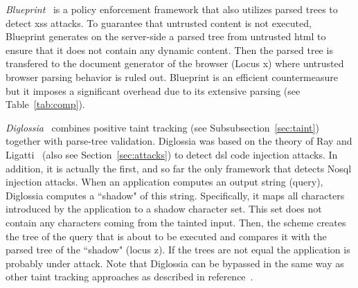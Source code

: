 \documentclass[conference]{IEEEtran}
\begin{document}
{\it Blueprint}~\cite{LV09} is a policy enforcement framework that
also utilizes parsed trees to detect {\sc xss} attacks. To guarantee
that untrusted content is not executed, Blueprint generates on the
server-side a parsed tree from untrusted {\sc html} to ensure that it
does not contain any dynamic content. Then the parsed tree is
transfered to the document generator of the browser (Locus {\sc x})
where untrusted browser parsing behavior is ruled out. Blueprint is an
efficient countermeasure but it imposes a significant overhead due to
its extensive parsing (see Table~\ref{tab:comp}).

{\it Diglossia}~\cite{SMS13} combines positive taint tracking (see
Subsubsection~\ref{sec:taint}) together with parse-tree validation.
Diglossia was based on the theory of Ray and Ligatti~\cite{RL12b}
(also see Section~\ref{sec:attacks}) to detect {\sc dsl} code
injection attacks. In addition, it is actually the first, and so far
the only framework that detects No{\sc sql} injection attacks. When an
application computes an output string (query), Diglossia computes a
``shadow" of this string. Specifically, it maps all characters
introduced by the application to a shadow character set. This set does
not contain any characters coming from the tainted input. Then, the
scheme creates the tree of the query that is about to be executed and
compares it with the parsed tree of the ``shadow" (locus {\sc z}). If
the trees are not equal the application is probably under attack. Note
that Diglossia can be bypassed in the same way as other taint
tracking approaches as described in reference~\cite{NBR14}.
\end{document}
